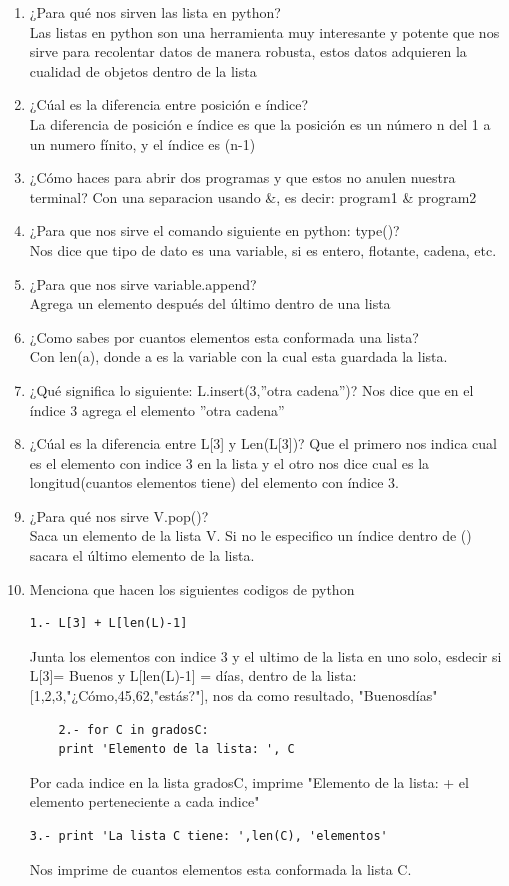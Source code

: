 \documentclass[letterpaper, 12pt, oneside]{article}%
\begin{document}
\begin{enumerate}
	\item ¿Para qué nos sirven las lista en python?\\
	Las listas en python son una herramienta muy interesante y potente que nos sirve para recolentar datos de manera robusta, estos datos adquieren la cualidad de objetos dentro de la lista
	\item ¿Cúal es la diferencia entre posición e índice?\\
	La diferencia de posición e índice es que la posición es un número n del 1 a un numero fínito, y el índice es (n-1)
	\item ¿Cómo haces para abrir dos programas y que estos no anulen nuestra terminal?
	Con una separacion usando \&, es decir: program1 \& program2
	\item ¿Para que nos sirve el comando siguiente en python: type()?\\
	Nos dice que tipo de dato es una variable, si es entero, flotante, cadena, etc.
	\item ¿Para que nos sirve variable.append?\\
	Agrega un elemento después del último dentro de una lista
	\item ¿Como sabes por cuantos elementos esta conformada una lista?\\
	Con len(a), donde a es la variable con la cual esta guardada la lista.
	\item ¿Qué significa lo siguiente: L.insert(3,”otra cadena”)?
	Nos dice que en el índice 3 agrega el elemento ”otra cadena”
	\item ¿Cúal es la diferencia entre L[3] y Len(L[3])?
	Que el primero nos indica cual es el elemento con indice 3 en la lista y el otro nos dice cual es la longitud(cuantos elementos tiene) del elemento con índice 3.
	\item ¿Para qué nos sirve V.pop()?\\
	Saca un elemento de la lista V. Si no le especifico un índice dentro de () sacara el último elemento de la lista.
	\newpage
	\item Menciona que hacen los siguientes codigos de python
	\begin{verbatim}
1.- L[3] + L[len(L)-1] 
	\end{verbatim}
	Junta los elementos con indice 3 y el ultimo de la lista en uno solo, esdecir si L[3]= Buenos y L[len(L)-1] = días, dentro de la lista:
	 [1,2,3,"¿Cómo,45,62,"estás?"], nos da como resultado, "Buenosdías"
	\begin{verbatim}
	2.- for C in gradosC:
	print 'Elemento de la lista: ', C
	\end{verbatim}
	Por cada indice en la lista gradosC, imprime "Elemento de la lista: + el elemento perteneciente a cada indice" 
	\begin{verbatim}
3.- print 'La lista C tiene: ',len(C), 'elementos'
	\end{verbatim}
		Nos imprime de cuantos elementos esta conformada la lista C.
	
	
\end{enumerate}%
\end{document}
